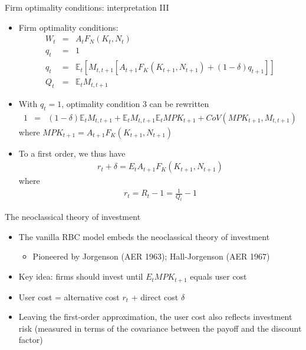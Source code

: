\documentclass[9pt,xcolor={dvipsnames}]{beamer}
\newcommand{\bit}{\begin{itemize}}
\newcommand{\eit}{\end{itemize}}
\newcommand{\bc}{\color{blue}}
\begin{document}
\begin{frame}{Firm optimality conditions: interpretation III}

\bit
\setlength\itemsep{2em} 

\item Firm optimality conditions:
\begin{eqnarray}
W_t &=& A_t F_N(K_t, N_t) \nonumber \\
q_t &=& 1 \nonumber \\
q_t &=&  \mathbb E_t \left[M_{t,t+1}\left[A_{t+1}F_K(K_{t+1}, N_{t+1}) + (1-\delta)q_{t+1} \right] \right] \nonumber \\
Q_t &=& \mathbb E_t M_{t,t+1} \nonumber
\end{eqnarray}


\item With $q_t=1$, optimality condition 3 can be rewritten
\begin{eqnarray}
1  &=&  (1-\delta) \mathbb E_t M_{t,t+1} + \mathbb E_t M_{t,t+1} \mathbb E_t MPK_{t+1} + CoV(MPK_{t+1}, M_{t,t+1}) \nonumber 
\end{eqnarray}
where $MPK_{t+1} = A_{t+1}F_K(K_{t+1}, N_{t+1})$

\item To a first order, we thus have
\begin{eqnarray}
r_{t} + \delta = E_t A_{t+1}F_K(K_{t+1}, N_{t+1}) \nonumber
\end{eqnarray}
where 
\begin{eqnarray}
r_{t}=R_{t}-1=\frac{1}{Q_t}-1 \nonumber
\end{eqnarray}

\eit

\end{frame}



\begin{frame}{The neoclassical theory of investment}

\bit
\setlength\itemsep{1.5em}

\item The vanilla RBC model embeds the {\bc neoclassical theory of investment}
\bit
	\item Pioneered by Jorgenson (AER 1963); Hall-Jorgenson (AER 1967) 
\eit

\item Key idea: firms should invest until $E_t MPK_{t+1}$ equals {\bc user cost}

\item {\bc User cost} = alternative cost $r_{t}$ + direct cost $\delta$

\item Leaving the first-order approximation, the user cost also reflects investment risk (measured in terms of the covariance between the payoff and the discount factor)

\eit

\end{frame}
\end{document}
